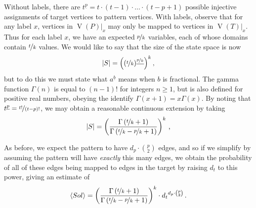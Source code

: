 \documentclass[twoside,11pt]{article}
\begin{document}
Without labels, there are $t^{\underline{p}} = t \cdot (t - 1) \cdot \ldots \cdot (t - p + 1)$
possible injective assignments of target vertices to pattern vertices.  With labels, observe that
for any label $x$, vertices in $\operatorname{V}(P)|_x$ may only be mapped to vertices in
$\operatorname{V}(T)|_x$.  Thus for each label $x$, we have an expected $\nicefrac{p}{k}$ variables,
each of whose domains contain $\nicefrac{t}{k}$ values. We would like to say that the size of the
state space is now \[ |S| = \left((\nicefrac{t}{k})^{\underline{\nicefrac{p}{k}}}\right)^{k}
\textnormal{,} \] but to do this we must state what $a^{\underline{b}}$ means when $b$ is
fractional. The gamma function $\Gamma(n)$ is equal to $(n - 1)!$ for integers $n \ge 1$, but is also
defined for positive real numbers, obeying the identify $\Gamma(x + 1) = x\Gamma(x)$. By noting that
$t^{\underline{p}} = \nicefrac{t!}{(t - p)!}$, we may obtain a reasonable
continuous extension by taking \[ |S| = \left(\frac{\Gamma\left(\nicefrac{t}{k} +
1\right)}{\Gamma\left(\nicefrac{t}{k} - \nicefrac{p}{k} + 1\right)}\right)^{k} \textnormal{\,,} \]

As before, we expect the pattern to have $d_p \cdot \binom{p}{2}$ edges, and so if we simplify by
assuming the pattern will have \emph{exactly} this many edges, we obtain the
probability of all of these edges being mapped to edges in the target by raising $d_t$ to this
power, giving an estimate of \begin{equation}\label{equation:non-induced-labelled-prediction} \langle Sol \rangle = \left(
    \frac{\Gamma\left(\nicefrac{t}{k} + 1\right)}{\Gamma\left(\nicefrac{t}{k} - \nicefrac{p}{k} +
1\right)} \right)^{k}  \cdot
{d_t}^{d_p \cdot \binom{p}{2}} \textnormal{\,.} \end{equation}
\end{document}
